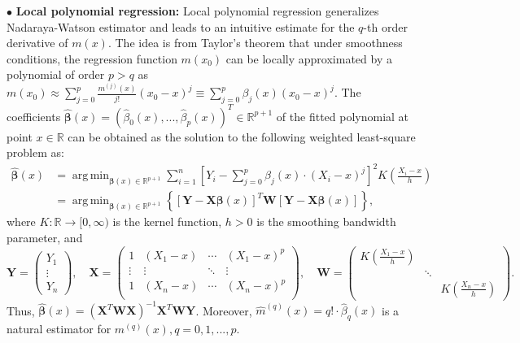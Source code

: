 \documentclass{uwstat572}
\theoremstyle{definition}
\DeclareMathOperator*{\argmin}{arg\,min}
\renewcommand{\hat}{\widehat}
\theoremstyle{theorem}
\begin{document}
$\bullet$ {\bf Local polynomial regression:} Local polynomial regression \citep{fan1996local} generalizes Nadaraya-Watson estimator and leads to an intuitive estimate for the $q$-th order derivative of $m(x)$. The idea is from Taylor's theorem \citep{rudin1976principles} that under smoothness conditions, the regression function $m(x_0)$ can be locally approximated by a polynomial of order $p>q$ as $
m(x_0)\approx \sum_{j=0}^p \frac{m^{(j)}(x)}{j!}(x_0-x)^j \equiv \sum_{j=0}^p \beta_j(x)\left(x_0-x\right)^j.$ 
The coefficients $\hat{\bm{\beta}}(x)=\left(\hat{\beta}_0(x),...,\hat{\beta}_p(x)\right)^T\in \mathbb{R}^{p+1}$ of the fitted polynomial at point $x\in \mathbb{R}$ can be obtained as the solution to the following weighted least-square problem as:
\begin{equation}
\label{loc_pol}
\begin{split}
\hat{\bm{\beta}}(x) &=\argmin_{\bm{\beta}(x)\in \mathbb{R}^{p+1}} \sum_{i=1}^n \left[Y_i - \sum_{j=0}^p \beta_j(x)\cdot (X_i -x)^j \right]^2 K\left(\frac{X_i-x}{h}\right) \\
&= \argmin_{\bm{\beta}(x)\in \mathbb{R}^{p+1}} \left\{\left[\bm{Y} - \bm{X}\bm{\beta}(x)\right]^T \bm{W} \left[\bm{Y} - \bm{X}\bm{\beta}(x)\right] \right\},
\end{split}
\end{equation}
where $K:\mathbb{R}\to [0,\infty)$ is the kernel function, $h>0$ is the smoothing bandwidth parameter, and  
$$\bm{Y} = \begin{pmatrix}
Y_1\\
\vdots\\
Y_n
\end{pmatrix}, \quad \bm{X} = \begin{pmatrix}
1 & (X_1-x) & \cdots & (X_1-x)^p\\
\vdots & \vdots & \ddots & \vdots\\
1 & (X_n-x) & \cdots & (X_n-x)^p\\
\end{pmatrix}, \quad \bm{W} = \begin{pmatrix}
K\left(\frac{X_1-x}{h}\right) & & \\
& \ddots & \\
& & K\left(\frac{X_n-x}{h}\right)
\end{pmatrix}.$$
Thus, $\hat{\bm{\beta}}(x) = \left(\bm{X}^T\bm{W}\bm{X}\right)^{-1} \bm{X}^T \bm{W}\bm{Y}$. Moreover, $\hat{m}^{(q)}(x) = q!\cdot\hat{\beta}_q(x)$ is a natural estimator for $m^{(q)}(x), q=0,1,...,p$. 
\end{document}
